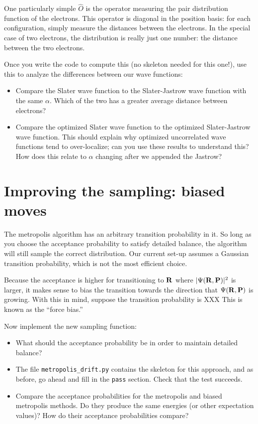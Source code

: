 \documentclass[12pt]{article}
\newcommand{\bR}{{\bf R}}
\newcommand{\bP}{{\bf P}}
\begin{document}
One particularly simple $\hat O$ is the operator measuring the pair distribution function of the electrons. 
This operator is diagonal in the position basis: for each configuration, simply measure the distances between the electrons.
In the special case of two electrons, the distribution is really just one number: the distance between the two electrons.

Once you write the code to compute this (no skeleton needed for this one!), use this to analyze the differences between our wave functions:
\begin{itemize}
  \item
    Compare the Slater wave function to the Slater-Jastrow wave function with the same $\alpha$. 
    Which of the two has a greater average distance between electrons?
  \item
    Compare the optimized Slater wave function to the optimized Slater-Jastrow wave function. 
    This should explain why optimized uncorrelated wave functions tend to over-localize; can you use these results to understand this? How does this relate to $\alpha$ changing after we appended the Jastrow?
\end{itemize}

\section{Improving the sampling: biased moves} 

The metropolis algorithm has an arbitrary transition probability in it. 
So long as you choose the acceptance probability to satisfy detailed balance, the algorithm will still sample the correct distribution.
Our current set-up assumes a Gaussian transition probability, which is not the most efficient choice.

Because the acceptance is higher for transitioning to $\bR$ where $|\Psi(\bR,\bP)|^2$ is larger, it makes sense to bias the transition towards the direction that $\Psi(\bR,\bP)$ is growing.
With this in mind, suppose the transition probability is 
XXX
This is known as the ``force bias.''

Now implement the new sampling function:
\begin{itemize}
  \item
    What should the acceptance probability be in order to maintain detailed balance?
  \item
    The file \verb|metropolis_drift.py| contains the skeleton for this approach, and as before, go ahead and fill in the \verb|pass| section. Check that the test succeeds.
  \item
    Compare the acceptance probabilities for the metropolis and biased metropolis methods. 
    Do they produce the same energies (or other expectation values)? 
    How do their acceptance probabilities compare?
\end{itemize}
\end{document}
